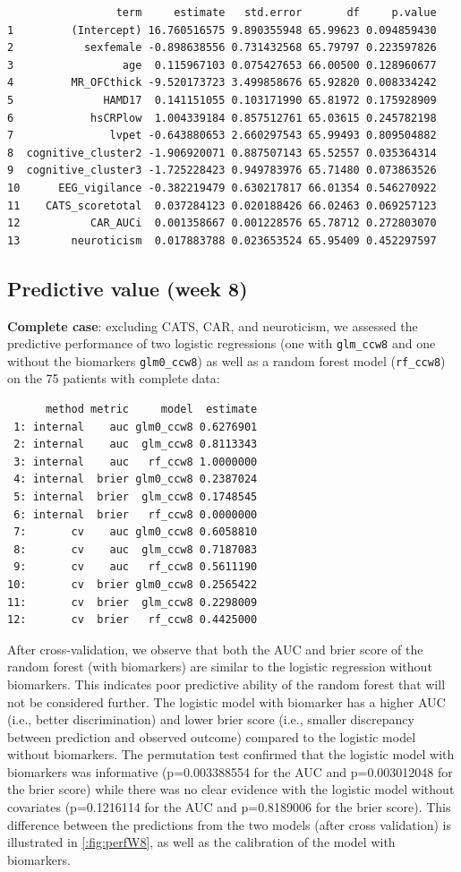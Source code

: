 \documentclass[12pt]{article}
\begin{document}
\begin{verbatim}
                 term     estimate   std.error       df     p.value
1         (Intercept) 16.760516575 9.890355948 65.99623 0.094859430
2           sexfemale -0.898638556 0.731432568 65.79797 0.223597826
3                 age  0.115967103 0.075427653 66.00500 0.128960677
4         MR_OFCthick -9.520173723 3.499858676 65.92820 0.008334242
5              HAMD17  0.141151055 0.103171990 65.81972 0.175928909
6            hsCRPlow  1.004339184 0.857512761 65.03615 0.245782198
7               lvpet -0.643880653 2.660297543 65.99493 0.809504882
8  cognitive_cluster2 -1.906920071 0.887507143 65.52557 0.035364314
9  cognitive_cluster3 -1.725228423 0.949783976 65.71480 0.073863526
10      EEG_vigilance -0.382219479 0.630217817 66.01354 0.546270922
11    CATS_scoretotal  0.037284123 0.020188426 66.02463 0.069257123
12           CAR_AUCi  0.001358667 0.001228576 65.78712 0.272803070
13        neuroticism  0.017883788 0.023653524 65.95409 0.452297597
\end{verbatim}

\subsection{Predictive value (week 8)}
\label{sec:orgf5ae7a9}

\textbf{Complete case}: excluding CATS, CAR, and neuroticism, we assessed the
predictive performance of two logistic regressions (one with
\texttt{glm\_ccw8} and one without the biomarkers \texttt{glm0\_ccw8}) as well as a
random forest model (\texttt{rf\_ccw8}) on the 75 patients with complete data:
\begin{verbatim}
      method metric     model  estimate
 1: internal    auc glm0_ccw8 0.6276901
 2: internal    auc  glm_ccw8 0.8113343
 3: internal    auc   rf_ccw8 1.0000000
 4: internal  brier glm0_ccw8 0.2387024
 5: internal  brier  glm_ccw8 0.1748545
 6: internal  brier   rf_ccw8 0.0000000
 7:       cv    auc glm0_ccw8 0.6058810
 8:       cv    auc  glm_ccw8 0.7187083
 9:       cv    auc   rf_ccw8 0.5611190
10:       cv  brier glm0_ccw8 0.2565422
11:       cv  brier  glm_ccw8 0.2298009
12:       cv  brier   rf_ccw8 0.4425000
\end{verbatim}

After cross-validation, we observe that both the AUC and brier score
of the random forest (with biomarkers) are similar to the logistic
regression without biomarkers. This indicates poor predictive ability
of the random forest that will not be considered further. The logistic
model with biomarker has a higher AUC (i.e., better discrimination)
and lower brier score (i.e., smaller discrepancy between prediction
and observed outcome) compared to the logistic model without
biomarkers. The permutation test confirmed that the logistic model
with biomarkers was informative (p=0.003388554 for the AUC and
p=0.003012048 for the brier score) while there was no clear evidence
with the logistic model without covariates (p=0.1216114 for the AUC
and p=0.8189006 for the brier score). This difference between the
predictions from the two models (after cross validation) is
illustrated in \autoref{:fig:perfW8}, as well as the calibration of the
model with biomarkers.
\end{document}
